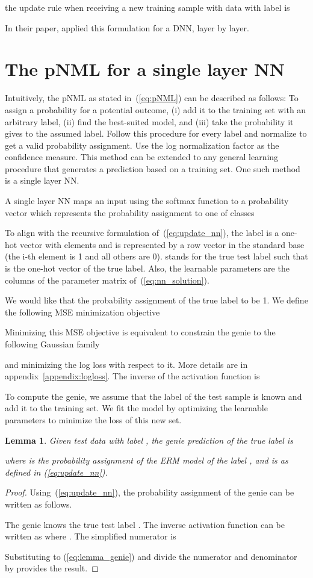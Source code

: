 \documentclass{article}
\def\appref#1{appendix~\ref{#1}}
\def\eqref#1{(\ref{#1})}
\newtheorem{lemma}{Lemma}
\begin{document}
the update rule when receiving a new training sample with data 
 with label  is

In their paper, \citet{zhuang2020training} applied this formulation for a DNN, layer by layer.


\section{The pNML for a single layer NN}
\label{sec:pnml_regret}

Intuitively, the pNML as stated in~\eqref{eq:pNML} can be described as follows: To assign a probability for a potential outcome, (i) add it to the training set with an arbitrary label, (ii) find the best-suited model, and (iii) take the probability it gives to the assumed label. 
Follow this procedure for every label and normalize to get a valid probability assignment. Use the log normalization factor as the confidence measure.
This method can be extended to any general learning procedure that generates a prediction based on a training set. 
One such method is a single layer NN.

A single layer NN maps an input  using the softmax function to a probability vector which represents the probability assignment to one of  classes

To align with the recursive formulation  of~\eqref{eq:update_nn}, the label  is a one-hot vector with  elements and is represented by a row vector in the standard base  (the i-th element is 1 and all others are 0).
 stands for the true test label such that  is the one-hot vector of the true label.
Also, the learnable parameters  are the columns of the parameter matrix of~\eqref{eq:nn_solution}.

We would like that the probability assignment of the true label to be 1. We define the following MSE minimization objective

Minimizing this MSE objective is equivalent to constrain the genie to the following Gaussian family

and minimizing the log loss with respect to it.
More details are in \appref{appendix:logloss}.
The inverse of the activation function is


To compute the genie, we assume that the label of the test sample is known and add it to the training set. We fit the model by optimizing the learnable parameters to minimize the loss of this new set.
\begin{lemma} \label{lemma:genie}
Given test data  with label , the genie prediction of the true label is 

where  is the probability assignment of the ERM model of the label , and  is as defined in \eqref{eq:update_nn}.
\end{lemma}
\begin{proof}
Using~\eqref{eq:update_nn}, the probability assignment of the genie can be written as follows.

The genie knows the true test label . The inverse activation function can be written as 
 where .
The simplified numerator is

Substituting to \eqref{eq:lemma_genie}
and divide the numerator and denominator by  provides the result.
\end{proof}
\end{document}
